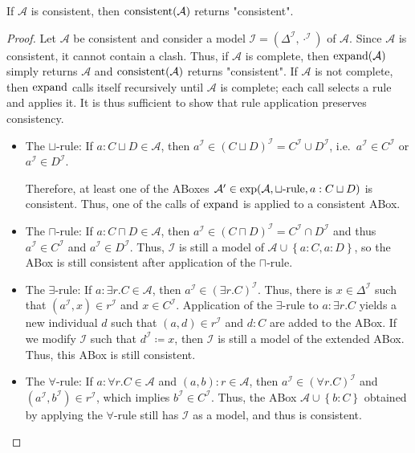 \begin{lemma}
	If $\mathcal{A}$ is consistent, then $\operatorname{\text{consistent}}(\mathcal{A})$ returns "consistent".
\end{lemma}
\begin{proof}
	Let $\mathcal{A}$ be consistent and consider a model $\mathcal{I} = (\Delta^\mathcal{I}, \cdot^\mathcal{I})$ of $\mathcal{A}$.
	Since $\mathcal{A}$ is consistent, it cannot contain a clash.
	Thus, if $\mathcal{A}$ is complete, then $\operatorname{\text{expand}}(\mathcal{A})$ simply returns $\mathcal{A}$ and $\operatorname{\text{consistent}}(\mathcal{A})$ returns "consistent".
	If $\mathcal{A}$ is not complete, then $\operatorname{\text{expand}}$ calls itself recursively until $\mathcal{A}$ is complete;
	each call selects a rule and applies it.
	It is thus sufficient to show that rule application preserves consistency.
	\begin{itemize}
		\item The $\sqcup$-rule: If $a : C \sqcup D \in \mathcal{A}$, then $a^\mathcal{I} \in (C \sqcup D)^\mathcal{I} = C^\mathcal{I} \cup D^\mathcal{I}$,
			i.e.\ $a^\mathcal{I} \in C^\mathcal{I}$ or $a^\mathcal{I} \in D^\mathcal{I}$.

			Therefore, at least one of the ABoxes $\mathcal{A}' \in \func{exp}(\mathcal{A}, \sqcup \text{-rule}, a:C \sqcup D)$ is consistent.
			Thus, one of the calls of $\operatorname{\text{expand}}$ is applied to a consistent ABox.
		\item The $\sqcap$-rule: If $a : C \sqcap D \in \mathcal{A}$, then $a^\mathcal{I} \in (C \sqcap D)^\mathcal{I} = C^\mathcal{I} \cap D^\mathcal{I}$ 
			and thus $a^\mathcal{I} \in C^\mathcal{I}$ and $a^\mathcal{I} \in D^\mathcal{I}$.
			Thus, $\mathcal{I}$ is still a model of $\mathcal{A} \cup \left\{ a:C, a:D \right\}$, so the ABox is still consistent after application of the $\sqcap$-rule.
		\item The $\exists$-rule: If $a : \exists r.C \in \mathcal{A}$, then $a^\mathcal{I} \in (\exists r.C)^\mathcal{I}$.
			Thus, there is $x \in \Delta^\mathcal{I}$ such that $(a^\mathcal{I}, x) \in r^\mathcal{I}$ and $x \in C^\mathcal{I}$.
			Application of the $\exists$-rule to $a : \exists r.C$ yields a new individual $d$ such that $(a,d) \in r^\mathcal{I}$ and $d : C$ are added to the ABox.
			If we modify  $\mathcal{I}$ such that $d^\mathcal{I} \coloneqq x$, then $\mathcal{I}$ is still a model of the extended ABox.
			Thus, this ABox is still consistent.
	\item The $\forall$-rule: If $a : \forall r.C \in \mathcal{A}$ and $(a,b):r \in \mathcal{A}$, then $a^\mathcal{I} \in (\forall r.C)^\mathcal{I}$ and $(a^\mathcal{I}, b^\mathcal{I}) \in r^\mathcal{I}$,
			which implies $b^\mathcal{I} \in C^\mathcal{I}$.
			Thus, the ABox $\mathcal{A} \cup \left\{ b:C \right\}$ obtained by applying the $\forall$-rule still has $\mathcal{I}$ as a model,
			and thus is consistent.
			\qedhere
	\end{itemize}
\end{proof}

